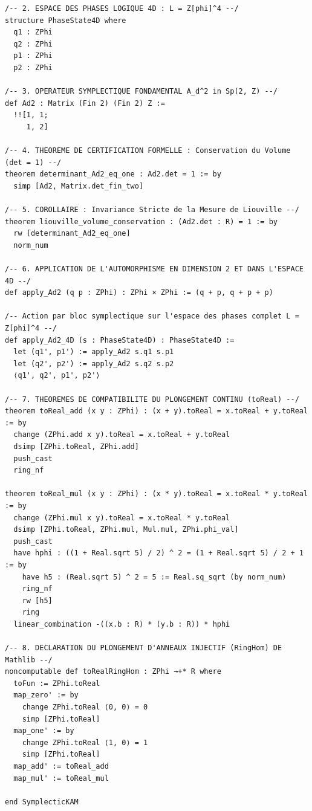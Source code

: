 \documentclass[10pt,twocolumn,a4paper]{article}
\theoremstyle{plain}
\theoremstyle{definition}
\begin{document}
\begin{lstlisting}[caption={Code Lean 4 Certifié (Intégral 146 Lignes)}]
/-- 2. ESPACE DES PHASES LOGIQUE 4D : L = Z[phi]^4 --/
structure PhaseState4D where
  q1 : ZPhi
  q2 : ZPhi
  p1 : ZPhi
  p2 : ZPhi

/-- 3. OPERATEUR SYMPLECTIQUE FONDAMENTAL A_d^2 in Sp(2, Z) --/
def Ad2 : Matrix (Fin 2) (Fin 2) Z :=
  !![1, 1;
     1, 2]

/-- 4. THEOREME DE CERTIFICATION FORMELLE : Conservation du Volume (det = 1) --/
theorem determinant_Ad2_eq_one : Ad2.det = 1 := by
  simp [Ad2, Matrix.det_fin_two]

/-- 5. COROLLAIRE : Invariance Stricte de la Mesure de Liouville --/
theorem liouville_volume_conservation : (Ad2.det : R) = 1 := by
  rw [determinant_Ad2_eq_one]
  norm_num

/-- 6. APPLICATION DE L'AUTOMORPHISME EN DIMENSION 2 ET DANS L'ESPACE 4D --/
def apply_Ad2 (q p : ZPhi) : ZPhi × ZPhi := (q + p, q + p + p)

/-- Action par bloc symplectique sur l'espace des phases complet L = Z[phi]^4 --/
def apply_Ad2_4D (s : PhaseState4D) : PhaseState4D :=
  let (q1', p1') := apply_Ad2 s.q1 s.p1
  let (q2', p2') := apply_Ad2 s.q2 s.p2
  ⟨q1', q2', p1', p2'⟩

/-- 7. THEOREMES DE COMPATIBILITE DU PLONGEMENT CONTINU (toReal) --/
theorem toReal_add (x y : ZPhi) : (x + y).toReal = x.toReal + y.toReal := by
  change (ZPhi.add x y).toReal = x.toReal + y.toReal
  dsimp [ZPhi.toReal, ZPhi.add]
  push_cast
  ring_nf

theorem toReal_mul (x y : ZPhi) : (x * y).toReal = x.toReal * y.toReal := by
  change (ZPhi.mul x y).toReal = x.toReal * y.toReal
  dsimp [ZPhi.toReal, ZPhi.mul, Mul.mul, ZPhi.phi_val]
  push_cast
  have hphi : ((1 + Real.sqrt 5) / 2) ^ 2 = (1 + Real.sqrt 5) / 2 + 1 := by
    have h5 : (Real.sqrt 5) ^ 2 = 5 := Real.sq_sqrt (by norm_num)
    ring_nf
    rw [h5]
    ring
  linear_combination -((x.b : R) * (y.b : R)) * hphi

/-- 8. DECLARATION DU PLONGEMENT D'ANNEAUX INJECTIF (RingHom) DE Mathlib --/
noncomputable def toRealRingHom : ZPhi →+* R where
  toFun := ZPhi.toReal
  map_zero' := by
    change ZPhi.toReal ⟨0, 0⟩ = 0
    simp [ZPhi.toReal]
  map_one' := by
    change ZPhi.toReal ⟨1, 0⟩ = 1
    simp [ZPhi.toReal]
  map_add' := toReal_add
  map_mul' := toReal_mul

end SymplecticKAM
\end{lstlisting}
\end{document}
